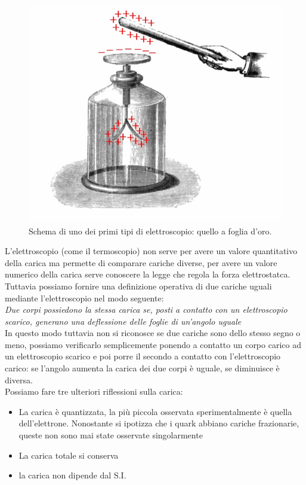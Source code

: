 \documentclass[10pt,a4paper]{article}
\begin{document}
\begin{figure}[h!]
	\centering
	\includegraphics[width=0.4\linewidth]{images/elettroscopio}
	\caption{Schema di uno dei primi tipi di elettroscopio: quello a foglia d'oro.}
	\label{fig:elettroscopio}
\end{figure}
\FloatBarrier
L'elettroscopio (come il termoscopio) non serve per avere un valore quantitativo della carica ma permette di comparare cariche diverse, per avere un valore numerico della carica serve conoscere la legge che regola la forza elettrostatca. Tuttavia possiamo fornire una definizione operativa di due cariche uguali mediante l'elettroscopio nel modo seguente:\\
\textit{Due corpi possiedono la stessa carica se, posti a contatto con un elettroscopio scarico, generano una deflessione delle foglie di un'angolo uguale}\\
In questo modo tuttavia non si riconosce se due cariche sono dello stesso segno o meno, possiamo verificarlo semplicemente ponendo a contatto un corpo carico ad un elettroscopio scarico e poi porre il secondo a contatto con l'elettroscopio carico: se l'angolo aumenta la carica dei due corpi è uguale, se diminuisce è diversa.\\
Possiamo fare tre ulteriori riflessioni sulla carica:
\begin{itemize}
	\item La carica è quantizzata, la più piccola osservata sperimentalmente è quella dell'elettrone. Nonostante si ipotizza che i quark abbiano cariche frazionarie, queste non sono mai state osservate singolarmente
	\item La carica totale si conserva
	\item la carica non dipende dal S.I.
\end{itemize}
\end{document}
